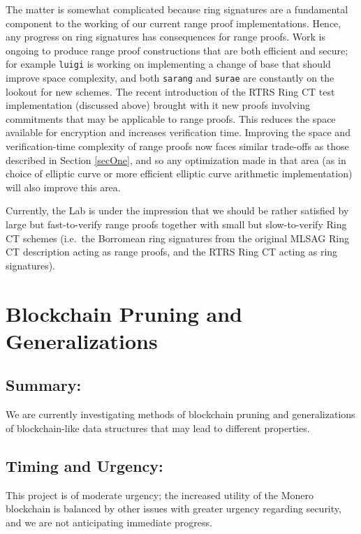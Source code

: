 \documentclass[12pt,english]{mrl}
\theoremstyle{definition}
\numberwithin{equation}{section}
\numberwithin{figure}{section}
\numberwithin{equation}{section}
\numberwithin{equation}{section}
\numberwithin{figure}{section}
\begin{document}
The matter is somewhat complicated because ring signatures are a fundamental component to the working of our current range proof implementations. Hence, any progress on ring signatures has consequences for range proofs. Work is ongoing to produce range proof constructions that are both efficient and secure; for example \texttt{luigi} is working on implementing a change of base that should improve space complexity, and both \texttt{sarang} and \texttt{surae} are constantly on the lookout for new schemes. The recent introduction of the RTRS Ring CT test implementation (discussed above) brought with it new proofs involving commitments that may be applicable to range proofs. This reduces the space available for encryption and increases verification time. Improving the space and verification-time complexity of range proofs now faces similar trade-offs as those described in Section \ref{secOne}, and so any optimization made in that area (as in choice of elliptic curve or more efficient elliptic curve arithmetic implementation) will also improve this area. 

Currently, the Lab is under the impression that we should be rather satisfied by large but fast-to-verify range proofs together with small but slow-to-verify Ring CT schemes (i.e.\ the Borromean ring signatures from the original MLSAG Ring CT description acting as range proofs, and the RTRS Ring CT acting as ring signatures). 





\section{Blockchain Pruning and Generalizations}

\subsection{Summary:} 

We are currently investigating methods of blockchain pruning and generalizations of blockchain-like data structures that may lead to different properties. 

\subsection{Timing and Urgency:} 

This project is of moderate urgency; the increased utility of the Monero blockchain is balanced by other issues with greater urgency regarding security, and we are not anticipating immediate progress.
\end{document}
